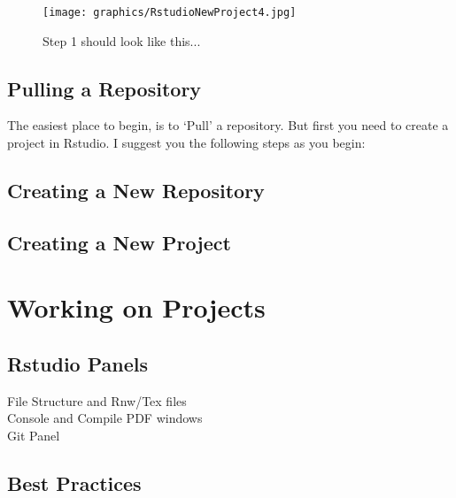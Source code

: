 \documentclass[12pt]{../SOP3_beta}
\begin{document}
\begin{figure}
\texttt{[image: graphics/RstudioNewProject4.jpg]}
\caption{Step 1 should look like this...}
\end{figure}


\subsection{Pulling a Repository}

\NP The easiest place to begin, is to `Pull' a repository. But first you need to create a project in Rstudio. I suggest you the following steps as you begin:







\subsection{Creating a New Repository}

\subsection{Creating a New Project}


\section{Working on Projects}

\subsection{Rstudio Panels}

\begin{description}
  \item[File Structure and Rnw/Tex files]
  \item[Console and Compile PDF windows]
  \item[Git Panel]
\end{description}


\subsection{Best Practices}
\end{document}

